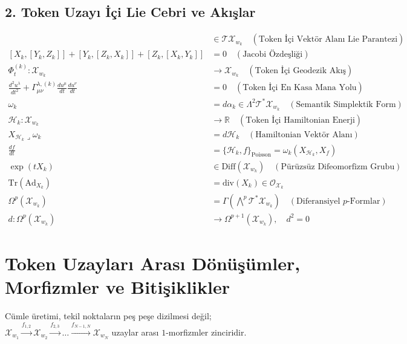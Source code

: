 \documentclass[11pt, a4paper]{article}
\begin{document}
\subsection{2. Token Uzayı İçi Lie Cebri ve Akışlar}
\begin{align}
[X_k, Y_k] &\in \mathcal{T}\mathcal{X}_{w_k} \quad (\text{Token İçi Vektör Alanı Lie Parantezi}) \\
[X_k, [Y_k, Z_k]] + [Y_k, [Z_k, X_k]] + [Z_k, [X_k, Y_k]] &= 0 \quad (\text{Jacobi Özdeşliği}) \\
\Phi_t^{(k)} : \mathcal{X}_{w_k} &\longrightarrow \mathcal{X}_{w_k} \quad (\text{Token İçi Geodezik Akış}) \\
\frac{d^2 u^\lambda}{dt^2} + \Gamma_{\mu\nu}^{\lambda, (k)} \frac{du^\mu}{dt} \frac{du^\nu}{dt} &= 0 \quad (\text{Token İçi En Kasa Mana Yolu}) \\
\omega_k &= d\alpha_k \in \Lambda^2 \mathcal{T}^*\mathcal{X}_{w_k} \quad (\text{Semantik Simplektik Form}) \\
\mathcal{H}_k : \mathcal{X}_{w_k} &\longrightarrow \mathbb{R} \quad (\text{Token İçi Hamiltonian Enerji}) \\
X_{\mathcal{H}_k} \mathbin{\lrcorner} \omega_k &= d\mathcal{H}_k \quad (\text{Hamiltonian Vektör Alanı}) \\
\frac{df}{dt} &= \{\mathcal{H}_k, f\}_{\text{Poisson}} = \omega_k(X_{\mathcal{H}_k}, X_f) \\
\exp(t X_k) &\in \text{Diff}(\mathcal{X}_{w_k}) \quad (\text{Pürüzsüz Difeomorfizm Grubu}) \\
\text{Tr}(\text{Ad}_{X_k}) &= \text{div}(X_k) \in \mathcal{O}_{\mathcal{X}_k} \\
\Omega^p(\mathcal{X}_{w_k}) &= \Gamma\left( \bigwedge^p \mathcal{T}^*\mathcal{X}_{w_k} \right) \quad (\text{Diferansiyel $p$-Formlar}) \\
d : \Omega^p(\mathcal{X}_{w_k}) &\longrightarrow \Omega^{p+1}(\mathcal{X}_{w_k}), \quad d^2 = 0
\end{align}

\section{Token Uzayları Arası Dönüşümler, Morfizmler ve Bitişiklikler}

Cümle üretimi, tekil noktaların peş peşe dizilmesi değil; $\mathcal{X}_{w_1} \xrightarrow{f_{1,2}} \mathcal{X}_{w_2} \xrightarrow{f_{2,3}} \dots \xrightarrow{f_{N-1,N}} \mathcal{X}_{w_N}$ uzaylar arası $1$-morfizmler zinciridir.
\end{document}
